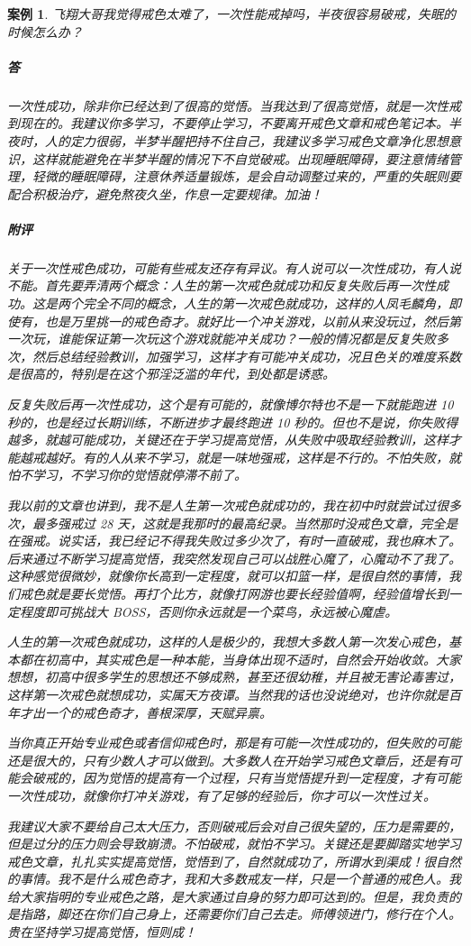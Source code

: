 \documentclass{ctexart}
\newtheorem{case}{案例}
\begin{document}
\begin{case}
    飞翔大哥我觉得戒色太难了，一次性能戒掉吗，半夜很容易破戒，失眠的时候怎么办？
    \subparagraph{答} 一次性成功，除非你已经达到了很高的觉悟。当我达到了很高觉悟，就是一次性戒到现在的。我建议你多学习，不要停止学习，不要离开戒色文章和戒色笔记本。半夜时，人的定力很弱，半梦半醒把持不住自己，我建议多学习戒色文章净化思想意识，这样就能避免在半梦半醒的情况下不自觉破戒。出现睡眠障碍，要注意情绪管理，轻微的睡眠障碍，注意休养适量锻炼，是会自动调整过来的，严重的失眠则要配合积极治疗，避免熬夜久坐，作息一定要规律。加油！
    \subparagraph{附评} 关于一次性戒色成功，可能有些戒友还存有异议。有人说可以一次性成功，有人说不能。首先要弄清两个概念：人生的第一次戒色就成功和反复失败后再一次性成功。这是两个完全不同的概念，人生的第一次戒色就成功，这样的人凤毛麟角，即使有，也是万里挑一的戒色奇才。就好比一个冲关游戏，以前从来没玩过，然后第一次玩，谁能保证第一次玩这个游戏就能冲关成功？一般的情况都是反复失败多次，然后总结经验教训，加强学习，这样才有可能冲关成功，况且色关的难度系数是很高的，特别是在这个邪淫泛滥的年代，到处都是诱惑。

    反复失败后再一次性成功，这个是有可能的，就像博尔特也不是一下就能跑进 10 秒的，也是经过长期训练，不断进步才最终跑进 10 秒的。但也不是说，你失败得越多，就越可能成功，关键还在于学习提高觉悟，从失败中吸取经验教训，这样才能越戒越好。有的人从来不学习，就是一味地强戒，这样是不行的。不怕失败，就怕不学习，不学习你的觉悟就停滞不前了。

    我以前的文章也讲到，我不是人生第一次戒色就成功的，我在初中时就尝试过很多次，最多强戒过 28 天，这就是我那时的最高纪录。当然那时没戒色文章，完全是在强戒。说实话，我已经记不得我失败过多少次了，有时一直破戒，我也麻木了。后来通过不断学习提高觉悟，我突然发现自己可以战胜心魔了，心魔动不了我了。这种感觉很微妙，就像你长高到一定程度，就可以扣篮一样，是很自然的事情，我们戒色就是要长觉悟。再打个比方，就像打网游也要长经验值啊，经验值增长到一定程度即可挑战大 BOSS，否则你永远就是一个菜鸟，永远被心魔虐。

    人生的第一次戒色就成功，这样的人是极少的，我想大多数人第一次发心戒色，基本都在初高中，其实戒色是一种本能，当身体出现不适时，自然会开始收敛。大家想想，初高中很多学生的思想还不够成熟，甚至还很幼稚，并且被无害论毒害过，这样第一次戒色就想成功，实属天方夜谭。当然我的话也没说绝对，也许你就是百年才出一个的戒色奇才，善根深厚，天赋异禀。

    当你真正开始专业戒色或者信仰戒色时，那是有可能一次性成功的，但失败的可能还是很大的，只有少数人才可以做到。大多数人在开始学习戒色文章后，还是有可能会破戒的，因为觉悟的提高有一个过程，只有当觉悟提升到一定程度，才有可能一次性成功，就像你打冲关游戏，有了足够的经验后，你才可以一次性过关。

    我建议大家不要给自己太大压力，否则破戒后会对自己很失望的，压力是需要的，但是过分的压力则会导致崩溃。不怕破戒，就怕不学习。关键还是要脚踏实地学习戒色文章，扎扎实实提高觉悟，觉悟到了，自然就成功了，所谓水到渠成！很自然的事情。我不是什么戒色奇才，我和大多数戒友一样，只是一个普通的戒色人。我给大家指明的专业戒色之路，是大家通过自身的努力即可达到的。但是，我负责的是指路，脚还在你们自己身上，还需要你们自己去走。师傅领进门，修行在个人。贵在坚持学习提高觉悟，恒则成！
\end{case}
\end{document}
